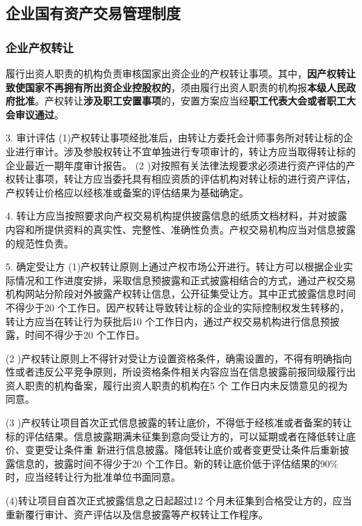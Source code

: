 \documentclass[UTF8,12pt]{ctexart}
\numberwithin{equation}{section} %
\numberwithin{figure}{section}
\numberwithin{table}{section}
\begin{document}
	
	\subsection{企业国有资产交易管理制度}
	
	\subsubsection{企业产权转让}
	
	履行出资人职责的机构负责审核国家出资企业的产权转让事项。其中，\textbf{因产权转让致使国家不再拥有所出资企业控股权的}，须由履行出资人职责的机构报\textbf{本级人民政府批准}。产权转让\textbf{涉及职工安置事项}的，安置方案应当经\textbf{职工代表大会或者职工大会审议通过}。
	
	3. 审计评估
	(1)产权转让事项经批准后，由转让方委托会计师事务所对转让标的企业进行审计。涉及参股权转让不宜单独进行专项审计的，转让方应当取得转让标的企业最近一期年度审计报告。
	(2 )对按照有关法律法规要求必须进行资产评估的产权转让事项，转让方应当委托具有相应资质的评估机构对转让标的进行资产评估，产权转让价格应以经核准或备案的评估结果为基础确定。
	
	4. 转让方应当按照要求向产权交易机构提供披露信息的纸质文档材料，并对披露内容和所提供资料的真实性、完整性、准确性负责。产权交易机构应当对信息披露的规范性负责。
	

	5. 确定受让方
	(1)产权转让原则上通过产权市场公开进行。转让方可以根据企业实际情况和工作进度安排，采取信息预披露和正式披露相结合的方式，通过产权交易机构网站分阶段对外披露产权转让信息，公开征集受让方。其中正式披露信息时间不得少于20 个工作日。因产权转让导致转让标的企业的实际控制权发生转移的，转让方应当在转让行为获批后10 个工作日内，通过产权交易机构进行信息预披露，时间不得少于20 个工作日。
	
	(2 )产权转让原则上不得针对受让方设置资格条件，确需设置的，不得有明确指向性或者违反公平竞争原则，所设资格条件相关内容应当在信息披露前报同级履行出资人职责的机构备案，履行出资人职责的机构在5 个 工作日内未反馈意见的视为同意。
	
	(3 )产权转让项目首次正式信息披露的转让底价，不得低于经核准或者备案的转让标的评估结果。信息披露期满未征集到意向受让方的，可以延期或者在降低转让底价、变更受让条件重 新进行信息披露。降低转让底价或者变更受让条件后重新披露信息的，披露时间不得少于20 个工作日。新的转让底价低于评估结果的90\%时，应当经转让行为批准单位书面同意。
	
	(4)转让项目自首次正式披露信息之日起超过12 个月未征集到合格受让方的，应当重新覆行审计、资产评估以及信息披露等产权转让工作程序。
	
\end{document}
